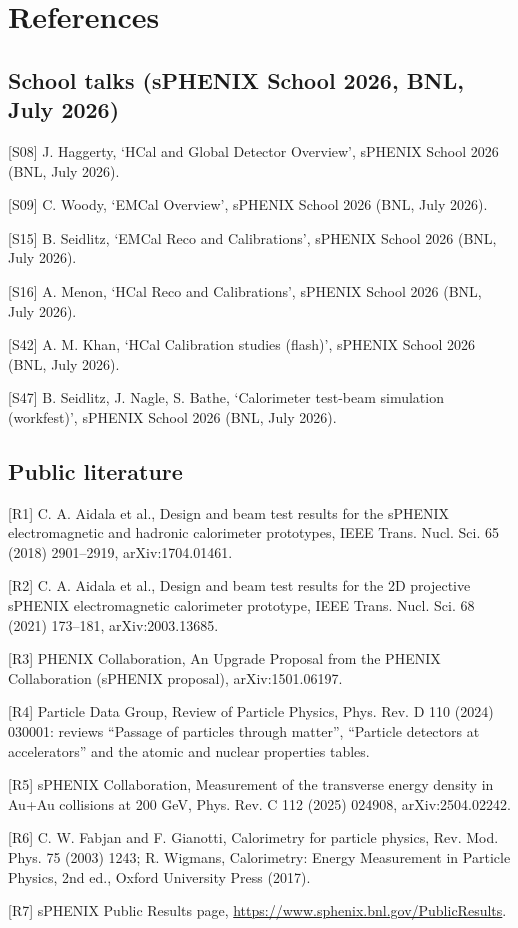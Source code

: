 \documentclass[11pt,letterpaper]{article}
\begin{document}
\section*{References}
\subsection*{School talks (sPHENIX School 2026, BNL, July 2026)}
\begin{description}[itemsep=1pt,font=\normalfont]
\item{[S08]} J. Haggerty, `HCal and Global Detector Overview', sPHENIX School 2026 (BNL, July 2026).
\item{[S09]} C. Woody, `EMCal Overview', sPHENIX School 2026 (BNL, July 2026).
\item{[S15]} B. Seidlitz, `EMCal Reco and Calibrations', sPHENIX School 2026 (BNL, July 2026).
\item{[S16]} A. Menon, `HCal Reco and Calibrations', sPHENIX School 2026 (BNL, July 2026).
\item{[S42]} A. M. Khan, `HCal Calibration studies (flash)', sPHENIX School 2026 (BNL, July 2026).
\item{[S47]} B. Seidlitz, J. Nagle, S. Bathe, `Calorimeter test-beam simulation (workfest)', sPHENIX School 2026 (BNL, July 2026).
\end{description}
\subsection*{Public literature}
\begin{description}[itemsep=1pt,font=\normalfont]
\item{[R1]} C. A. Aidala et al., Design and beam test results for the sPHENIX electromagnetic and hadronic calorimeter prototypes, IEEE Trans. Nucl. Sci. 65 (2018) 2901--2919, arXiv:1704.01461.
\item{[R2]} C. A. Aidala et al., Design and beam test results for the 2D projective sPHENIX electromagnetic calorimeter prototype, IEEE Trans. Nucl. Sci. 68 (2021) 173--181, arXiv:2003.13685.
\item{[R3]} PHENIX Collaboration, An Upgrade Proposal from the PHENIX Collaboration (sPHENIX proposal), arXiv:1501.06197.
\item{[R4]} Particle Data Group, Review of Particle Physics, Phys. Rev. D 110 (2024) 030001: reviews ``Passage of particles through matter'', ``Particle detectors at accelerators'' and the atomic and nuclear properties tables.
\item{[R5]} sPHENIX Collaboration, Measurement of the transverse energy density in Au+Au collisions at 200 GeV, Phys. Rev. C 112 (2025) 024908, arXiv:2504.02242.
\item{[R6]} C. W. Fabjan and F. Gianotti, Calorimetry for particle physics, Rev. Mod. Phys. 75 (2003) 1243; R. Wigmans, Calorimetry: Energy Measurement in Particle Physics, 2nd ed., Oxford University Press (2017).
\item{[R7]} sPHENIX Public Results page, \url{https://www.sphenix.bnl.gov/PublicResults}.
\end{description}
\end{document}
